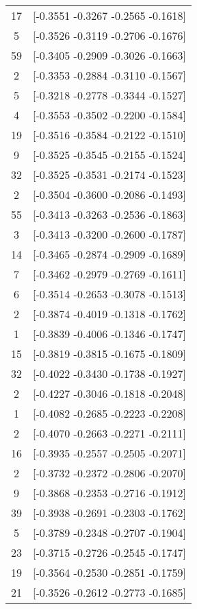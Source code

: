 \documentclass[12pt, fullpage,letterpaper]{article}
\begin{document}
\begin{enumerate}
\begin{enumerate}
{\begin{longtable}{|c|c|}
			 17 &  [-0.3551 -0.3267 -0.2565 -0.1618] \\
			  5 &  [-0.3526 -0.3119 -0.2706 -0.1676] \\
			 59 &  [-0.3405 -0.2909 -0.3026 -0.1663] \\
			  2 &  [-0.3353 -0.2884 -0.3110 -0.1567] \\
			  5 &  [-0.3218 -0.2778 -0.3344 -0.1527] \\
			  4 &  [-0.3553 -0.3502 -0.2200 -0.1584] \\
			 19 &  [-0.3516 -0.3584 -0.2122 -0.1510] \\
			  9 &  [-0.3525 -0.3545 -0.2155 -0.1524] \\
			 32 &  [-0.3525 -0.3531 -0.2174 -0.1523] \\
			  2 &  [-0.3504 -0.3600 -0.2086 -0.1493] \\
			 55 &  [-0.3413 -0.3263 -0.2536 -0.1863] \\
			  3 &  [-0.3413 -0.3200 -0.2600 -0.1787] \\
			 14 &  [-0.3465 -0.2874 -0.2909 -0.1689] \\
			  7 &  [-0.3462 -0.2979 -0.2769 -0.1611] \\
			  6 &  [-0.3514 -0.2653 -0.3078 -0.1513] \\
			  2 &  [-0.3874 -0.4019 -0.1318 -0.1762] \\
			  1 &  [-0.3839 -0.4006 -0.1346 -0.1747] \\
			 15 &  [-0.3819 -0.3815 -0.1675 -0.1809] \\
			 32 &  [-0.4022 -0.3430 -0.1738 -0.1927] \\
			  2 &  [-0.4227 -0.3046 -0.1818 -0.2048] \\
			  1 &  [-0.4082 -0.2685 -0.2223 -0.2208] \\
			  2 &  [-0.4070 -0.2663 -0.2271 -0.2111] \\
			 16 &  [-0.3935 -0.2557 -0.2505 -0.2071] \\
			  2 &  [-0.3732 -0.2372 -0.2806 -0.2070] \\
			  9 &  [-0.3868 -0.2353 -0.2716 -0.1912] \\
			 39 &  [-0.3938 -0.2691 -0.2303 -0.1762] \\
			  5 &  [-0.3789 -0.2348 -0.2707 -0.1904] \\
			 23 &  [-0.3715 -0.2726 -0.2545 -0.1747] \\
			 19 &  [-0.3564 -0.2530 -0.2851 -0.1759] \\
			 21 &  [-0.3526 -0.2612 -0.2773 -0.1685] \\

\end{longtable}}
\end{enumerate}
\end{enumerate}
\end{document}
